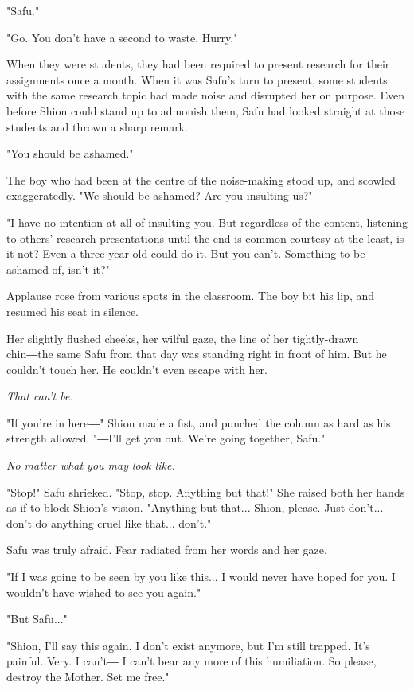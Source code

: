 "Safu."

"Go. You don't have a second to waste. Hurry."

When they were students, they had been required to present research for
their assignments once a month. When it was Safu's turn to present, some
students with the same research topic had made noise and disrupted her
on purpose. Even before Shion could stand up to admonish them, Safu had
looked straight at those students and thrown a sharp remark.

"You should be ashamed."

The boy who had been at the centre of the noise-making stood up, and
scowled exaggeratedly. "We should be ashamed? Are you insulting us?"

"I have no intention at all of insulting you. But regardless of the
content, listening to others' research presentations until the end is
common courtesy at the least, is it not? Even a three-year-old could do
it. But you can't. Something to be ashamed of, isn't it?"

Applause rose from various spots in the classroom. The boy bit his lip,
and resumed his seat in silence.

Her slightly flushed cheeks, her wilful gaze, the line of her
tightly-drawn chin―the same Safu from that day was standing right in
front of him. But he couldn't touch her. He couldn't even escape with
her.

\emph{That can't be.}

"If you're in here―" Shion made a fist, and punched the column as hard
as his strength allowed. "―I'll get you out. We're going together,
Safu."

\emph{No matter what you may look like.}

"Stop!" Safu shrieked. "Stop, stop. Anything but that!" She raised both
her hands as if to block Shion's vision. "Anything but that... Shion,
please. Just don't... don't do anything cruel like that... don't."

Safu was truly afraid. Fear radiated from her words and her gaze.

"If I was going to be seen by you like this... I would never have hoped
for you. I wouldn't have wished to see you again."

"But Safu..."

"Shion, I'll say this again. I don't exist anymore, but I'm still
trapped. It's painful. Very. I can't― I can't bear any more of this
humiliation. So please, destroy the Mother. Set me free."

